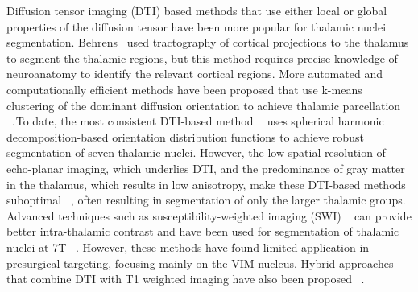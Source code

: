 \documentclass[3p,,final,12pt]{elsarticle}
\begin{document}
Diffusion tensor imaging (DTI) based methods that use either local or global properties of the diffusion tensor have been more popular for thalamic nuclei segmentation. Behrens\unskip~\cite{1643371:26789967} used tractography of cortical projections to the thalamus to segment the thalamic regions, but this method requires precise knowledge of neuroanatomy to identify the relevant cortical regions. More automated and computationally efficient methods have been proposed that use k-means clustering of the dominant diffusion orientation to achieve thalamic parcellation \unskip~\cite{1643371:26789911,1643371:26789930,1643371:26789941}.\ensuremath{^{}}To date, the most consistent DTI-based method \unskip~\cite{1643371:26789918}\ensuremath{^{}} uses spherical harmonic decomposition-based orientation distribution functions to achieve robust segmentation of seven thalamic nuclei. However, the low spatial resolution of echo-planar imaging, which underlies DTI, and the predominance of gray matter in the thalamus, which results in low anisotropy, make these DTI-based methods suboptimal \unskip~\cite{1643371:26789960}, often resulting in segmentation of only the larger thalamic groups. Advanced techniques such as susceptibility-weighted imaging (SWI) \unskip~\cite{1643371:26789920} can provide better intra-thalamic contrast and have been used for segmentation of thalamic nuclei at 7T \unskip~\cite{1643371:26789968,1643371:26789923}. However, these methods have found limited application in presurgical targeting, focusing mainly on the VIM nucleus. Hybrid approaches that combine DTI with T1 weighted imaging have also been proposed \unskip~\cite{1643371:26789958,1643371:26789948}.
\end{document}
